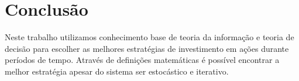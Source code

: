\section{Conclusão}

Neste trabalho utilizamos conhecimento base de teoria da informação e teoria de decisão para escolher as melhores estratégias de investimento em ações durante períodos de tempo.
Através de definições matemáticas é possível encontrar a melhor estratégia apesar do sistema ser estocástico e iterativo.